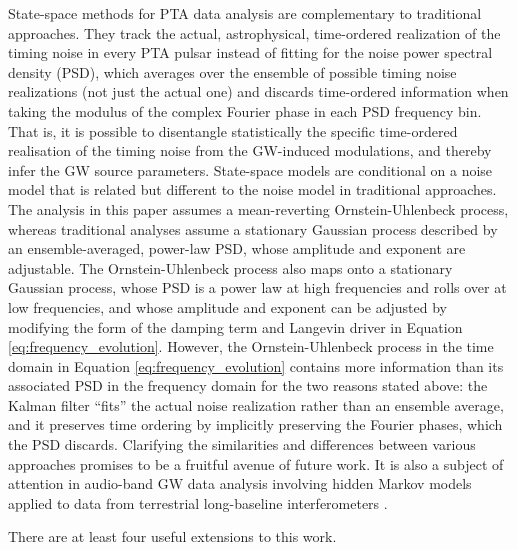 \documentclass[fleqn,usenatbib,useAMS]{mnras}
\begin{document}
State-space methods for PTA data analysis are complementary to traditional approaches. They track the actual, astrophysical, time-ordered realization of the timing noise in every PTA pulsar instead of fitting for the noise power spectral density (PSD), which averages over the ensemble of possible timing noise realizations (not just the actual one) and discards time-ordered information when taking the modulus of the complex Fourier phase in each PSD frequency bin. That is, it is possible to disentangle statistically the specific time-ordered realisation of the timing noise from the GW-induced modulations, and thereby infer the GW source parameters. State-space models are conditional on a noise model that is related but different to the noise model in traditional approaches. The analysis in this paper assumes a mean-reverting Ornstein-Uhlenbeck process, whereas traditional analyses assume a stationary Gaussian process described by an ensemble-averaged, power-law PSD, whose amplitude and exponent are adjustable. The Ornstein-Uhlenbeck process also maps onto a stationary Gaussian process, whose PSD is a power law at high frequencies and rolls over at low frequencies, and whose amplitude and exponent can be adjusted by modifying the form of the damping term and Langevin driver in Equation \eqref{eq:frequency_evolution}. However, the Ornstein-Uhlenbeck process in the time domain in Equation \eqref{eq:frequency_evolution} contains more information than its associated PSD in the frequency domain for the two reasons stated above: the Kalman filter ``fits'' the actual noise realization rather than an ensemble average, and it preserves time ordering by implicitly preserving the Fourier phases, which the PSD discards. Clarifying the similarities and differences between various approaches promises to be a fruitful avenue of future work. It is also a subject of attention in audio-band GW data analysis involving hidden Markov models applied to data from terrestrial long-baseline interferometers \citep{PhysRevD.102.023006,PhysRevD.105.022002,Abbott_2022SCO,2022PhRvD.106f2002A}. \newline 

There are at least four useful extensions to this work.
\end{document}
